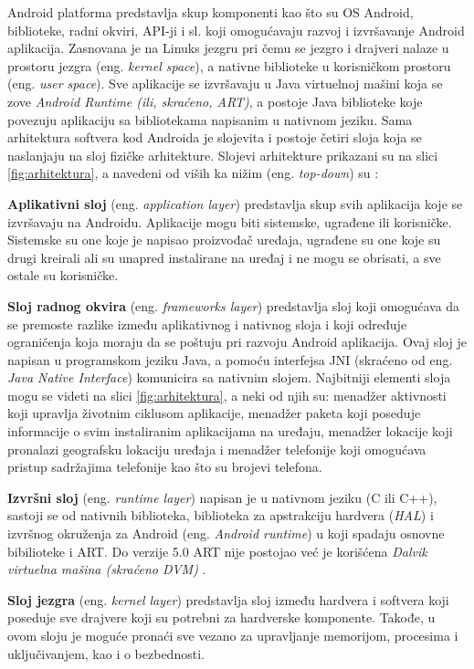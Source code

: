 \documentclass[android.tex]{subfiles}
\begin{document}
Android platforma predstavlja skup komponenti kao što su OS Android, biblioteke, radni okviri, API-ji i sl. koji omogućavaju razvoj i izvršavanje Android aplikacija. Zasnovana je na Linuks jezgru pri čemu se jezgro i drajveri nalaze u prostoru jezgra (eng. \textit{kernel space}), a nativne biblioteke u korisničkom prostoru (eng. \textit{user space}). Sve aplikacije se izvršavaju u Java virtuelnoj mašini koja se zove \textit{Android Runtime (ili, skraćeno, ART)}, a postoje Java biblioteke koje povezuju aplikaciju sa bibliotekama napisanim u nativnom jeziku. Sama arhitektura softvera kod Androida je slojevita i postoje četiri sloja koja se naslanjaju na sloj fizičke arhitekture. Slojevi arhitekture prikazani su na slici \ref{fig:arhitektura}, a navedeni od viših ka nižim (eng. \textit{top-down}) su \cite{book:papp}:
\begin{description}
\item \textbf{Aplikativni sloj} (eng. \textit{application layer}) predstavlja skup svih aplikacija koje se izvršavaju na Androidu. Aplikacije mogu biti sistemske, ugrađene ili korisničke. Sistemske su one koje je napisao proizvođač uređaja, ugrađene su one koje su drugi kreirali ali su unapred instalirane na uređaj i ne mogu se obrisati, a sve ostale su korisničke.
\item \textbf{Sloj radnog okvira} (eng. \textit{frameworks layer}) predstavlja sloj koji omogućava da se premoste razlike između aplikativnog i nativnog sloja i koji određuje ograničenja koja moraju da se poštuju pri razvoju Android aplikacija. Ovaj sloj je napisan u programskom jeziku Java, a pomoću interfejsa JNI (skraćeno od eng. \textit{Java Native Interface}) komunicira sa nativnim slojem. Najbitniji elementi sloja mogu se videti na slici \ref{fig:arhitektura}, a neki od njih su: menadžer aktivnosti koji upravlja životnim ciklusom aplikacije, menadžer paketa koji poseduje informacije o svim instaliranim aplikacijama na uređaju, menadžer lokacije koji pronalazi geografsku lokaciju uređaja i menadžer telefonije koji omogućava pristup sadržajima telefonije kao što su brojevi telefona. 
\item \textbf{Izvršni sloj} (eng. \textit{runtime layer}) napisan je u nativnom jeziku (C ili C++), sastoji se od nativnih biblioteka, biblioteka za apstrakciju hardvera (\textit{HAL}) i izvršnog okruženja za Android (eng. \textit{Android runtime}) u koji spadaju osnovne bibilioteke i ART. Do verzije 5.0 ART nije postojao već je korišćena \textit{Dalvik virtuelna mašina (skraćeno DVM)} \cite{sajt:dalvik}. 
\item \textbf{Sloj jezgra} (eng. \textit{kernel layer}) predstavlja sloj između hardvera i softvera koji poseduje sve drajvere koji su potrebni za hardverske komponente. Takođe, u ovom sloju je moguće pronaći sve vezano za upravljanje memorijom, procesima i uključivanjem, kao i o bezbednosti. 
\end{description}
\end{document}
